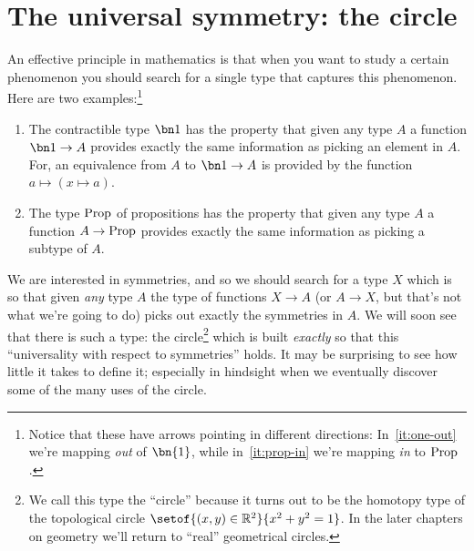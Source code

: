 \chapter{The universal symmetry: the circle}
\label{cha:circle}

An effective principle in mathematics is that when you want to study a certain
phenomenon you should search for a single type that captures this phenomenon.
Here are two examples:\footnote{%
  Notice that these have arrows pointing in different directions:
  In~\cref{it:one-out} we're mapping \emph{out} of $\bn{1}$,
  while in~\cref{it:prop-in} we're mapping \emph{in} to $\mathrm{Prop}$.}
\begin{enumerate}
\item\label{it:one-out}
  The contractible type $\bn 1$ has the property that given
any type $A$ a function $\bn 1\to A$ provides exactly the
same information as picking an element in $A$.
For, an equivalence from $A$ to $\bn 1\to A$ is provided by
the function $a \mapsto (x \mapsto a)$.
\item\label{it:prop-in}
  The type $\mathrm{Prop}$ of propositions has the property that
given any type $A$ a function $A\to\mathrm{Prop}$ provides exactly
the same information as picking a subtype of $A$.
\end{enumerate}
We are interested in symmetries, and so we should search for a type $X$
which is so that given \emph{any} type $A$ the type of functions
$X\to A$ (or $A\to X$, but that's not what we're going to do)
picks out exactly the symmetries in $A$.
We will soon see that there is such a type:
the circle\footnote{%
  We call this type the ``circle''
  because it turns out to be the homotopy type of
  the topological circle $\setof{(x,y)\in\RR^2}{x^2+y^2=1}$.
  In the later chapters on geometry we'll return
  to ``real'' geometrical circles.}
which is built \emph{exactly} so that this
``universality with respect to symmetries'' holds.
It may be surprising to see how little it takes to define it;
especially in hindsight when we eventually discover some of the many uses of the circle.

